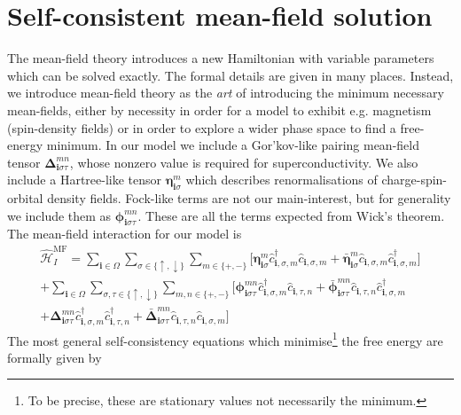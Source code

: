 \section{Self-consistent mean-field solution}
\label{sec:general_mean-field}
The mean-field theory introduces a new Hamiltonian with variable parameters which can be solved exactly. The formal details are given in many places. Instead, we introduce mean-field theory as the \textit{art} of introducing the minimum necessary mean-fields, either by necessity in order for a model to exhibit e.g. magnetism (spin-density fields) or in order to explore a wider phase space to find a free-energy minimum. In our model we include a Gor'kov-like pairing mean-field tensor $\bm{\Delta}_{\mathbf{i}\sigma\tau}^{mn}$, whose nonzero value is required for superconductivity. We also include a Hartree-like tensor $\bm{\eta}_{\mathbf{i}\sigma}^{m}$ which describes renormalisations of charge-spin-orbital density fields. Fock-like terms are not our main-interest, but for generality we include them as $\bm{\phi}_{\mathbf{i}\sigma\tau}^{mn}$. These are all the terms expected from Wick's theorem.
The mean-field interaction for our model is
\begin{multline}
\hat{\mathcal{H}}_I^\text{MF}=\sum_{\mathbf{i}\in\Omega}\sum_{\sigma\in\{\uparrow,\downarrow\}}\sum_{m\in\{+,-\}}\Big[
\bm{\eta}_{\mathbf{i}\sigma}^{m} \hat c_{\mathbf{i}, \sigma, m}^\dagger \hat c_{\mathbf{i}, \sigma, m} 
+\bar{\bm{\eta}}_{\mathbf{i}\sigma}^{m} \hat c_{\mathbf{i}, \sigma, m} \hat c_{\mathbf{i}, \sigma, m}^\dagger \Big] \\
+\sum_{\mathbf{i}\in\Omega}\sum_{\sigma,\tau\in\{\uparrow,\downarrow\}}\sum_{m,n\in\{+,-\}}\Big[
\bm{\phi}_{\mathbf{i}\sigma\tau}^{mn} \hat c_{\mathbf{i}, \sigma, m}^\dagger \hat c_{\mathbf{i}, \tau, n}
+\bar{\bm{\phi}}_{\mathbf{i}\sigma\tau}^{mn} \hat c_{\mathbf{i}, \tau,n} \hat c_{\mathbf{i}, \sigma,m}^\dagger\\
+\bm{\Delta}_{\mathbf{i}\sigma\tau}^{mn} \hat c_{\mathbf{i}, \sigma, m}^\dagger \hat c_{\mathbf{i}, \tau, n}^\dagger 
+\bar{\bm{\Delta}}_{\mathbf{i}\sigma\tau}^{mn} \hat c_{\mathbf{i}, \tau, n} \hat c_{\mathbf{i}, \sigma, m}
\Big]
\end{multline}
The most general self-consistency equations which minimise\footnote{To be precise, these are stationary values not necessarily the minimum.} the free energy are formally given by
